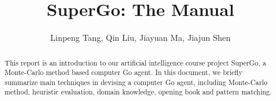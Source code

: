 \documentclass{article}
\theoremstyle{definition}
\theoremstyle{remark}
\numberwithin{equation}{section}
\begin{document}

\title{SuperGo: The Manual}
\author{Linpeng Tang, Qin Liu, Jiayuan Ma, Jiajun Shen}

\maketitle

\begin{abstract}
This report is an introduction to our artificial intelligence course project SuperGo, a Monte-Carlo method based computer Go agent. In this document, we briefly summarize main techniques in devising a computer Go agent, including Monte-Carlo method, heuristic evaluation, domain knowledge, opening book and pattern matching.
\end{abstract}




\end{document}
